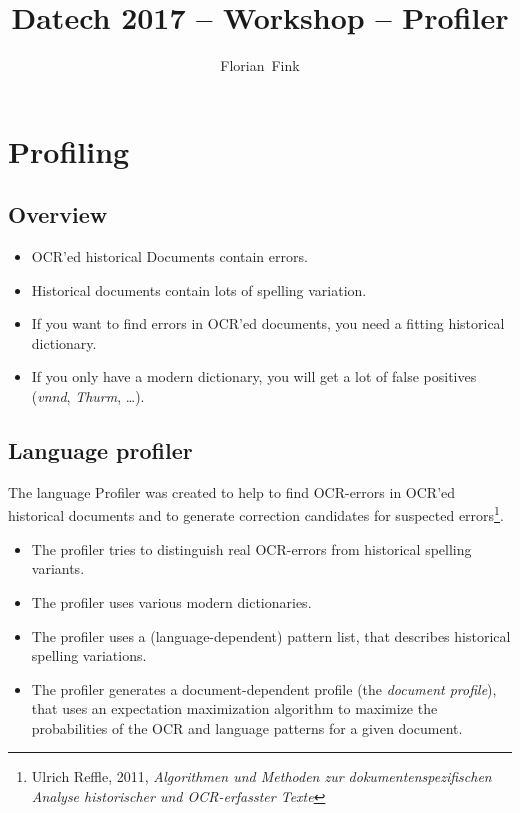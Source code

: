 
\title{Datech 2017 -- \pocoto{} Workshop -- Profiler}
\author{Florian~Fink}



\begin{frame}
	\titlepage
\end{frame}

\section{Profiling}
\subsection{Overview}
\begin{frame}
	\begin{itemize}
		\item OCR'ed historical Documents contain errors.
		\item Historical documents contain lots of spelling variation.
		\item If you want to find errors in OCR'ed documents, you need a fitting
			historical dictionary.
		\item If you only have a modern dictionary, you will get a lot of false
			positives (\emph{vnnd}, \emph{Thurm}, \dots).
	\end{itemize}
\end{frame}

\subsection{Language profiler}
\begin{frame}
	The language Profiler was created to help to find OCR-errors in OCR'ed
	historical documents and to generate correction candidates for suspected
	errors\footnote{Ulrich Reffle, 2011, \emph{Algorithmen und Methoden
	zur dokumentenspezifischen Analyse historischer und OCR-erfasster Texte}}.

	\begin{itemize}
		\item The profiler tries to distinguish real OCR-errors from historical
			spelling variants.
		\item The profiler uses various modern dictionaries.
		\item The profiler uses a (language-dependent) pattern list, that describes
			historical spelling variations.
		\item The profiler generates a document-dependent profile (the \emph{document
			profile}), that uses an expectation maximization algorithm to maximize the
			probabilities of the OCR and language patterns for a given document.
	\end{itemize}
\end{frame}

